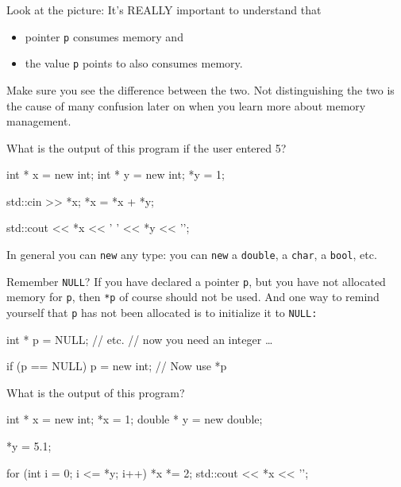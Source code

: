Look at the picture: It's REALLY important to understand that

\begin{itemize}

\item
  pointer \texttt{p} consumes memory and
\item
  the value \texttt{p} points to also consumes memory.
\end{itemize}

Make sure you see the difference between the two. Not distinguishing the two is the cause of many confusion later on when you learn more about memory management.

\begin{ex}
What is the output of this program if the user entered 5?

\begin{consolethree}[escapeinside=||]
int * x = new int;
int * y = new int;
*y = 1;

std::cin >> *x;
*x = *x + *y;

std::cout << *x << ' ' << *y << '\n';
\end{consolethree}
In general you can \texttt{new} any type: you can \texttt{new} a \texttt{double}, a \texttt{char}, a \texttt{bool}, etc.
\end{ex}

Remember \texttt{NULL}? If you have declared a pointer \texttt{p}, but you have not allocated memory for \texttt{p}, then \texttt{*p} of course should not be used. And one way to remind yourself that \texttt{p} has not been allocated is to initialize it to \texttt{NULL:}

\begin{consolethree}[escapeinside=||]
int * p = NULL;
                // etc.
                // now you need an integer \ldots

if (p == NULL)
{
    p = new int;
}
// Now use *p
\end{consolethree}

\begin{ex}
What is the output of this program?

\begin{consolethree}[escapeinside=||]
int * x = new int;
*x = 1;
double * y = new double;

*y = 5.1;

for (int i = 0; i <= *y; i++)
{
    *x *= 2;
}
std::cout << *x << '\n';
\end{consolethree}
\end{ex}

